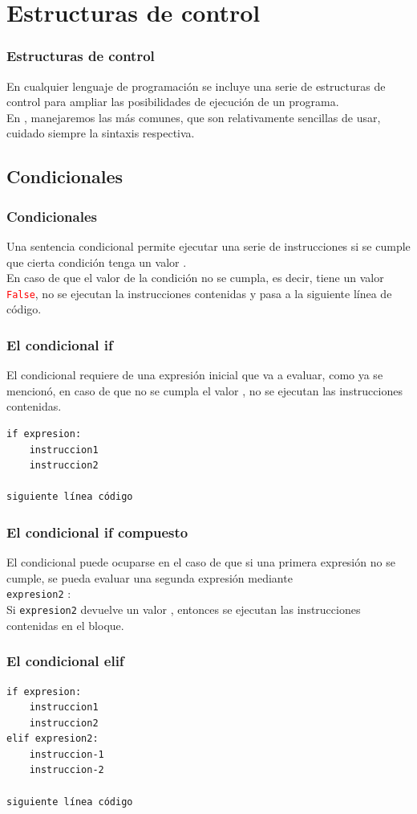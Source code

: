 \section{Estructuras de control}
\begin{frame}
\frametitle{Estructuras de control}
En cualquier lenguaje de programación se incluye una serie de estructuras de control para ampliar las posibilidades de ejecución de un programa.
\\
\bigskip
En \python, manejaremos las más comunes, que son relativamente sencillas de usar, cuidado siempre la sintaxis respectiva.
\end{frame}
\subsection{Condicionales}
\begin{frame}
\frametitle{Condicionales}
Una sentencia condicional permite ejecutar una serie de instrucciones si se cumple que cierta condición tenga un valor .
\\
\bigskip
En caso de que el valor de la condición no se cumpla, es decir, tiene un valor \textcolor{red}{\texttt{False}}, no se ejecutan la instrucciones contenidas y pasa a la siguiente línea de código.
\end{frame}
\begin{frame}[fragile]
\frametitle{El condicional if}
El condicional  requiere de una expresión inicial que va a evaluar, como ya se mencionó, en caso de que no se cumpla el valor , no se ejecutan las instrucciones contenidas.
\begin{verbatim}
if expresion:
    instruccion1
    instruccion2

siguiente línea código
\end{verbatim}
\end{frame}
\begin{frame}
\frametitle{El condicional if compuesto}
El condicional  puede ocuparse en el caso de que si una primera expresión no se cumple, se pueda evaluar una segunda expresión mediante
\\
\bigskip
{} \texttt{expresion2} :
\\
\bigskip
Si \texttt{expresion2} devuelve un valor , entonces se ejecutan las instrucciones contenidas en el bloque.
\end{frame}
\begin{frame}[fragile]
\frametitle{El condicional elif}

\begin{verbatim}
if expresion:
    instruccion1
    instruccion2
elif expresion2:
    instruccion-1
    instruccion-2

siguiente línea código
\end{verbatim}
\end{frame}
